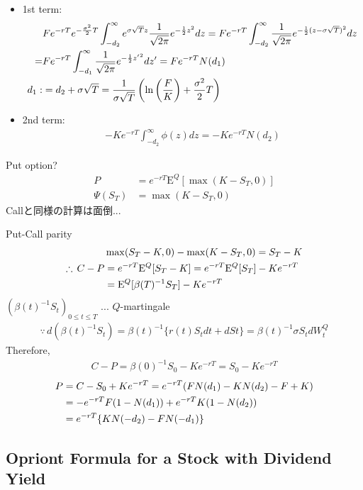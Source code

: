 \documentclass[a4paper,11pt]{jsarticle}
\theoremstyle{definition}
\newcommand{\df}[2]{\dfrac{#1}{#2}}
\begin{document}
\begin{itemize}
  \item 1st term:
  \begin{align}
    &Fe^{-rT}e^{-\frac{\sigma^2}{2}T}
    \int_{-d_2}^{\infty}e^{\sigma\sqrt{T}z}
    \df{1}{\sqrt{2\pi}}e^{-\frac{1}{2}z^2}dz
    =Fe^{-rT}\int_{-d_2}^{\infty}
    \df{1}{\sqrt{2\pi}}e^{-\frac{1}{2}(z-\sigma\sqrt{T})^2}dz
    \notag\\
    =&Fe^{-rT}\int_{-d_1}^{\infty}
    \df{1}{\sqrt{2\pi}}e^{-\frac{1}{2}{z'}^2}dz'
    =Fe^{-rT}N(d_1) \\
    d_1 :&=d_2+\sigma\sqrt{T}=\df{1}{\sigma\sqrt{T}}
    \left(\ln\left(\df{F}{K}\right)+\df{\sigma^2}{2}T\right)
  \end{align}
  \item 2nd term:
  \begin{align}
    -Ke^{-rT}\int_{-d_2}^{\infty}\phi(z)dz
    =-Ke^{-rT}N(d_2)
  \end{align}
\end{itemize}



Put option?
\begin{align}
  P&=e^{-rT}\mathrm{E}^Q[\max(K-S_T,0)] \\
  \Psi(S_T)&=\max(K-S_T,0)
\end{align}
Callと同様の計算は面倒...

Put-Call parity
\begin{align}
  &\max(S_T-K,0)-\max(K-S_T,0)=S_T-K \\
  \therefore\, C-P&=e^{-rT}\mathrm{E}^Q[S_T-K]
  =e^{-rT}\mathrm{E}^Q[S_T]-Ke^{-rT}\notag\\
  &=\mathrm{E}^Q[\beta(T)^{-1}S_T]-Ke^{-rT}
\end{align}
$(\beta(t)^{-1}S_t)_{0\leq t\leq T}$
... $Q$-martingale
\begin{align}
  \because \, d(\beta(t)^{-1}S_t)=\beta(t)^{-1}
  \{r(t)S_tdt+dSt\} =\beta(t)^{-1}\sigma S_tdW_t^Q
\end{align}
Therefore,
\begin{align}
  C-P=\beta(0)^{-1}S_0-Ke^{-rT}=S_0-Ke^{-rT}
\end{align}
\begin{align}
  P&=C-S_0+Ke^{-rT}
  =e^{-rT}(FN(d_1)-KN(d_2)-F+K)\notag\\
  &=-e^{-rT}F(1-N(d_1))+e^{-rT}K(1-N(d_2))\notag\\
  &=e^{-rT}\{KN(-d_2)-FN(-d_1)\}
\end{align}


\subsection{Opriont Formula for a Stock with Dividend Yield}
\end{document}

